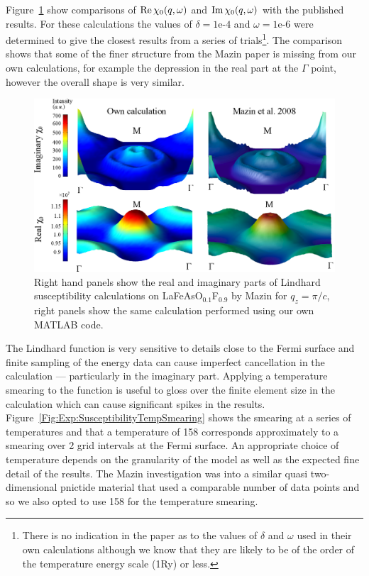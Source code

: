 Figure~\ref{Fig:Exp:MazinX0Comparison} show comparisons of $\operatorname{Re} \chi_0(q,\omega)$ and $\operatorname{Im} \chi_0(q,\omega)$ with the published results. For these calculations the values of $\delta=\textrm{1e-4}$ and $\omega=\textrm{1e-6}$ were determined to give the closest results from a series of trials\footnote{There is no indication in the paper as to the values of $\delta$ and $\omega$ used in their own calculations although we know that they are likely to be of the order of the temperature energy scale (\unit{1}{\milli Ry}) or less.}. The comparison shows that some of the finer structure from the Mazin paper is missing from our own calculations, for example the depression in the real part at the $\Gamma$ point, however the overall shape is very similar.

\begin{figure}[htbp]
    \begin{center}
        \includegraphics[scale=0.9]{Chapter-ExperimentalTechnique/Figures/Susceptibility/MazinComparison/MazinComparison}
        \caption{Right hand panels show the real and imaginary parts of Lindhard susceptibility calculations on LaFeAsO$_{0.1}$F$_{0.9}$ by Mazin \etal{} for $q_z=\pi/c$, right panels show the same calculation performed using our own MATLAB code.}
        \label{Fig:Exp:MazinX0Comparison}
    \end{center}
\end{figure}


The Lindhard function is very sensitive to details close to the Fermi surface and finite sampling of the energy data  can cause imperfect cancellation in the calculation --- particularly in the imaginary part. Applying a temperature smearing to the function is useful to gloss over the finite element size in the calculation which can cause significant spikes in the results. Figure~\ref{Fig:Exp:SusceptibilityTempSmearing} shows the smearing at a series of temperatures and that a temperature of \unit{158}{\kelvin} corresponds approximately to a smearing over 2 grid intervals at the Fermi surface. An appropriate choice of temperature depends on the granularity of the model as well as the expected fine detail of the results. The Mazin investigation was into a similar quasi two-dimensional pnictide material that used a comparable number of data points and so we also opted to use \unit{158}{\kelvin} for the temperature smearing.

